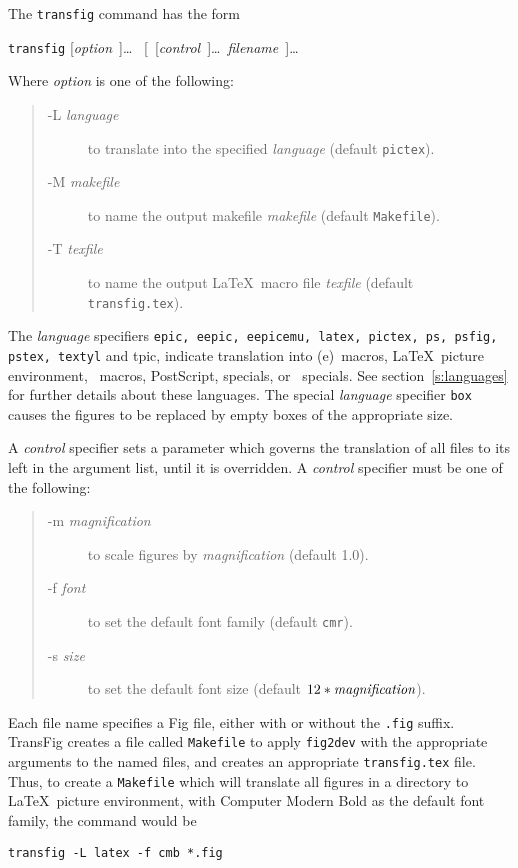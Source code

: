 The {\tt transfig} command has the form
%
\begin{center}
	{\tt transfig}	[{\it option}~]\ldots
			~[~[{\it control}~]\ldots ~{\it filename}~]\ldots
\end{center}
%
Where {\it option} is one of the following:
%
\begin{quote}
\begin{description}
\item[-L \it language]
	to translate into the specified {\it language}
	(default {\tt pictex}).
\item[-M \it makefile]
	to name the output makefile {\it makefile}
	(default {\tt Makefile}).
\item[-T \it texfile]
	to name the output \LaTeX\ macro file {\it texfile}
	(default {\tt transfig.tex}).
\end{description}
\end{quote}
%
The {\it language} specifiers
	{\tt epic, eepic, eepicemu, latex, pictex, ps,
	\linebreak psfig, pstex, textyl} and {tpic},
	indicate translation into
	{\sc (e)}\EPIC\ macros, \LaTeX\ picture environment,
	\PicTeX\ macros, PostScript,
	\textyl specials, or \tpic\ specials.
See section~\ref{s:languages} for further details about these languages.
The special {\it language} specifier {\tt box} causes the figures to be
	replaced by empty boxes of the appropriate size.

A {\it control} specifier sets a parameter which governs the translation
	of all files to its left in the argument list, until it is
	overridden.
A {\it control} specifier must be one of the following:
%
\begin{quote}
\begin{description}
\item[-m \it magnification]
	to scale figures by {\it magnification} (default 1.0).
\item[-f \it font]
	to set the default font family (default {\tt cmr}).
\item[-s \it size]
	to set the default font size (default $12*\mbox{\it magnification}$).
\end{description}
\end{quote}

Each file name specifies a Fig file, either with or without the {\tt .fig}
	suffix.
TransFig creates a file called {\tt Makefile} to apply {\tt fig2dev} with
	the appropriate arguments to the named files,
	and creates an appropriate {\tt transfig.tex} file.
Thus, to create a {\tt Makefile} which will translate all figures in a
	directory to \LaTeX\ picture environment, with Computer Modern Bold as
	the default font family, the command would be
%
\begin{center}
	{\tt transfig -L latex -f cmb *.fig}
\end{center}

